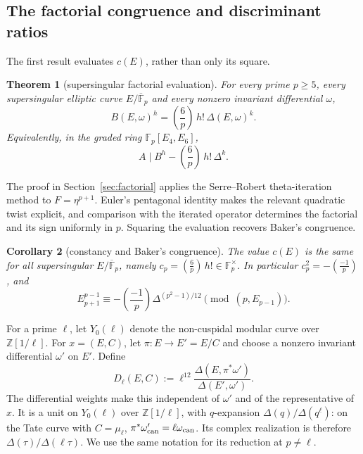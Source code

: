 \documentclass[11pt,a4paper]{article}
\numberwithin{equation}{section}
\newtheorem{theorem}{Theorem}[section]
\newtheorem{corollary}[theorem]{Corollary}
\theoremstyle{definition}
\theoremstyle{remark}
\newcommand{\Fp}{\mathbb F_p}
\newcommand{\Fb}{\overline{\mathbb F}_p}
\newcommand{\Z}{\mathbb Z}
\newcommand{\Lp}[1]{\left(\frac{#1}{p}\right)}
\begin{document}
\subsection{The factorial congruence and discriminant ratios}
The first result evaluates $c(E)$, rather than only its square.

\begin{theorem}[supersingular factorial evaluation]\label{thm:factorial}
For every prime $p\ge5$, every supersingular elliptic curve $E/\Fb$ and
every nonzero invariant differential $\omega$,
\begin{equation}\label{eq:factorial-evaluation}
B(E,\omega)^h=\Lp6\,h!\,\Delta(E,\omega)^k.
\end{equation}
Equivalently, in the graded ring $\Fp[E_4,E_6]$,
\begin{equation}\label{eq:factorial-divisibility}
A\mid B^h-\Lp6\,h!\,\Delta^k.
\end{equation}
\end{theorem}

The proof in Section~\ref{sec:factorial} applies the Serre--Robert
theta-iteration method to $F=\eta^{p+1}$. Euler's pentagonal identity
makes the relevant quadratic twist explicit, and comparison with the
iterated operator determines the factorial and its sign uniformly in $p$.
Squaring the evaluation recovers Baker's congruence.

\begin{corollary}[constancy and Baker's congruence]\label{cor:D}
The value $c(E)$ is the same for all supersingular $E/\Fb$, namely
$c_p=\Lp6\,h!\in\Fp^\times$. In particular
$c_p^2=-\Lp{-1}$, and
\[
E_{p+1}^{p-1}\equiv-\Lp{-1}\Delta^{(p^2-1)/12}
\pmod{(p,E_{p-1})}.
\]
\end{corollary}

For a prime $\ell$, let $Y_0(\ell)$ denote the non-cuspidal modular
curve over $\Z[1/\ell]$. For $x=(E,C)$, let $\pi:E\to E'=E/C$ and
choose a nonzero invariant differential $\omega'$ on $E'$. Define
\begin{equation}\label{eq:Dmoduli}
D_\ell(E,C):=\ell^{12}
\frac{\Delta(E,\pi^*\omega')}{\Delta(E',\omega')}.
\end{equation}
The differential weights make this independent of $\omega'$ and of the
representative of $x$. It is a unit on $Y_0(\ell)$ over $\Z[1/\ell]$,
with $q$-expansion $\Delta(q)/\Delta(q^\ell)$: on the Tate curve with
$C=\mu_\ell$, $\pi^*\omega'_{\rm can}=\ell\omega_{\rm can}$.
Its complex realization is therefore $\Delta(\tau)/\Delta(\ell\tau)$.
We use the same notation for its reduction at $p\ne\ell$.
\end{document}

